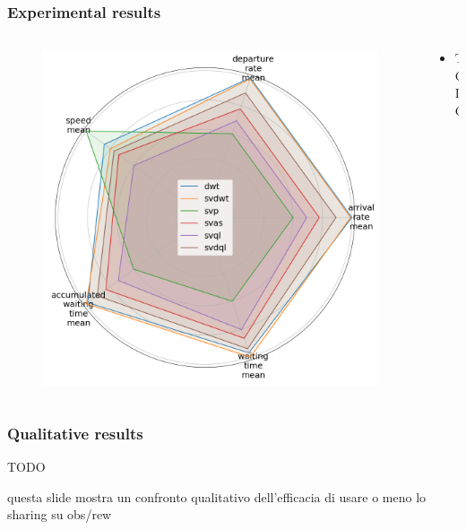 \documentclass[dvipsnames]{beamer}
\begin{document}
\begin{frame}
\frametitle{Experimental results}
  \begin{columns}
  \begin{column}{0.5\textwidth}
    \begin{figure}
      \centering
      \includegraphics[width=1.0\textwidth]{figures/rew-sharing-radar.png}
    \end{figure}
  \end{column}
  \begin{column}{0.5\textwidth}
    \begin{itemize}
      \item TODO
    \end{itemize}
  \end{column}
\end{columns}
\end{frame}

\begin{frame}
\frametitle{Qualitative results}
TODO

questa slide mostra un confronto qualitativo dell'efficacia di usare o meno lo sharing su obs/rew 
\end{frame}

\end{document}
